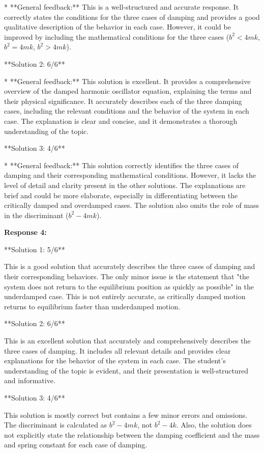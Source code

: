 \documentclass[a4paper,11pt]{article}
\begin{document}
* **General feedback:** This is a well-structured and accurate response. It correctly states the conditions for the three cases of damping and provides a good qualitative description of the behavior in each case. However, it could be improved by including the mathematical conditions for the three cases (\(b^2 < 4mk\), \(b^2 = 4mk\), \(b^2 > 4mk\)).


**Solution 2: 6/6**

* **General feedback:** This solution is excellent. It provides a comprehensive overview of the damped harmonic oscillator equation, explaining the terms and their physical significance. It accurately describes each of the three damping cases, including the relevant conditions and the behavior of the system in each case. The explanation is clear and concise, and it demonstrates a thorough understanding of the topic.


**Solution 3: 4/6**

* **General feedback:** This solution correctly identifies the three cases of damping and their corresponding mathematical conditions. However, it lacks the level of detail and clarity present in the other solutions. The explanations are brief and could be more elaborate, especially in differentiating between the critically damped and overdamped cases. The solution also omits the role of mass in the discriminant (\(b^2 - 4mk\)).

\bigskip    
\textbf{Response 4:}

**Solution 1: 5/6**

This is a good solution that accurately describes the three cases of damping and their corresponding behaviors. The only minor issue is the statement that "the system does not return to the equilibrium position as quickly as possible" in the underdamped case. This is not entirely accurate, as critically damped motion returns to equilibrium faster than underdamped motion.

**Solution 2: 6/6**

This is an excellent solution that accurately and comprehensively describes the three cases of damping. It includes all relevant details and provides clear explanations for the behavior of the system in each case. The student's understanding of the topic is evident, and their presentation is well-structured and informative.

**Solution 3: 4/6**

This solution is mostly correct but contains a few minor errors and omissions. The discriminant is calculated as \(b^2 - 4mk\), not \(b^2 - 4k\). Also, the solution does not explicitly state the relationship between the damping coefficient and the mass and spring constant for each case of damping.
\end{document}
